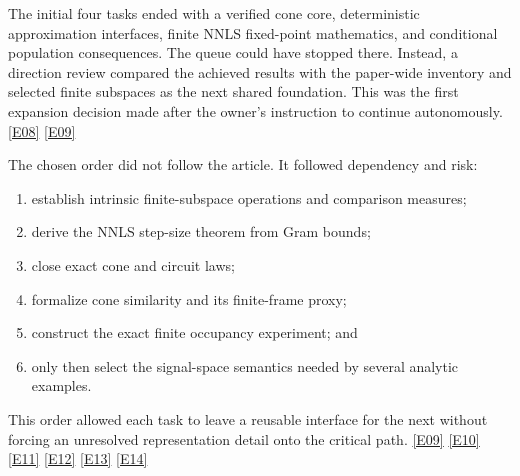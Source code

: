 \documentclass[11pt,a4paper]{article}
\newcommand{\ev}[1]{%
  \hyperref[ev:#1]{\textcolor{ReportBlue}{\textsf{\scriptsize[#1]}}}}
\begin{document}
The initial four tasks ended with a verified cone core, deterministic approximation
interfaces, finite NNLS fixed-point mathematics, and conditional population
consequences. The queue could have stopped there. Instead, a direction review compared
the achieved results with the paper-wide inventory and selected finite subspaces as
the next shared foundation. This was the first expansion decision made after the
owner's instruction to continue autonomously. \ev{E08}\ev{E09}

The chosen order did not follow the article. It followed dependency and risk:

\begin{enumerate}[label=\arabic*.]
  \item establish intrinsic finite-subspace operations and comparison measures;
  \item derive the NNLS step-size theorem from Gram bounds;
  \item close exact cone and circuit laws;
  \item formalize cone similarity and its finite-frame proxy;
  \item construct the exact finite occupancy experiment; and
  \item only then select the signal-space semantics needed by several analytic
    examples.
\end{enumerate}

This order allowed each task to leave a reusable interface for the next without
forcing an unresolved representation detail onto the critical path. \ev{E09}\ev{E10}\ev{E11}\ev{E12}\ev{E13}\ev{E14}
\end{document}
